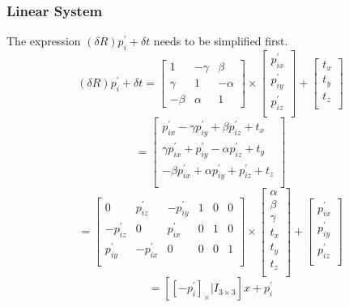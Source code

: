 \documentclass[12pt, a4paper]{article}
\begin{document}
\subsubsection{Linear System}
The expression $(\delta R)p_i^{'} + \delta t$ needs to be simplified first.
\[(\delta R)p_i^{'} + \delta t = \begin{bmatrix}
  1 & -\gamma & \beta\\
  \gamma & 1 & -\alpha\\
  -\beta & \alpha & 1
\end{bmatrix} \times \begin{bmatrix}
  p_{ix}^{'}\\
  p_{iy}^{'}\\
  p_{iz}^{'}\\
\end{bmatrix} + \begin{bmatrix}
  t_x\\
  t_y\\
  t_z\\
\end{bmatrix}\]
\[ = \begin{bmatrix}
  p_{ix}^{'} -\gamma p_{iy}^{'} + \beta p_{iz}^{'} + t_x\\
  \gamma p_{ix}^{'} + p_{iy}^{'} - \alpha p_{iz}^{'} + t_y\\
  -\beta p_{ix}^{'} + \alpha p_{iy}^{'} + p_{iz}^{'} + t_z\\
\end{bmatrix}\]
\[=\begin{bmatrix}
  0 & p_{iz}^{'} & -p_{iy}^{'} & 1 & 0 & 0\\
  -p_{iz}^{'} & 0 & p_{ix}^{'} & 0 & 1 & 0\\
  p_{iy}^{'} & -p_{ix}^{'} & 0 & 0 & 0 & 1\\
\end{bmatrix}\times\begin{bmatrix}
  \alpha \\
  \beta \\
  \gamma \\
  t_x \\
  t_y \\
  t_z \\
\end{bmatrix} + \begin{bmatrix}
  p_{ix}^{'} \\
  p_{iy}^{'} \\
  p_{iz}^{'} \\
\end{bmatrix}\]
\[= \left[[-p_{i}^{'}]_\times | I_{3\times 3}\right]x + p_{i}^{'}\]
\end{document}
